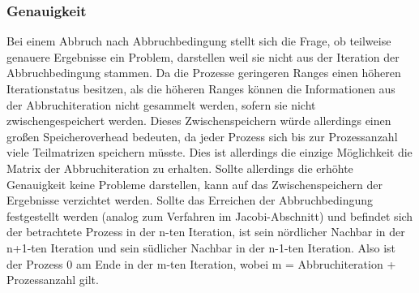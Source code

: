 \documentclass[a4paper,11pt,fleqn]{scrartcl}
\begin{document}
\subsubsection{Genauigkeit}
Bei einem Abbruch nach Abbruchbedingung stellt sich die Frage, ob teilweise genauere Ergebnisse ein Problem, darstellen weil sie nicht aus der Iteration der Abbruchbedingung stammen.
Da die Prozesse geringeren Ranges einen höheren Iterationstatus besitzen, als die höheren Ranges können die Informationen aus der Abbruchiteration nicht gesammelt werden, sofern sie nicht zwischengespeichert werden. 
Dieses Zwischenspeichern würde allerdings einen großen Speicheroverhead bedeuten, da jeder Prozess sich bis zur Prozessanzahl viele Teilmatrizen speichern müsste.
Dies ist allerdings die einzige Möglichkeit die Matrix der Abbruchiteration zu erhalten.
Sollte allerdings die erhöhte Genauigkeit keine Probleme darstellen, kann auf das Zwischenspeichern der Ergebnisse verzichtet werden.
Sollte das Erreichen der Abbruchbedingung festgestellt werden (analog zum Verfahren im Jacobi-Abschnitt) und befindet sich der betrachtete Prozess in der n-ten Iteration, ist sein nördlicher Nachbar in der n+1-ten Iteration und sein südlicher Nachbar in der n-1-ten Iteration.
Also ist der Prozess 0 am Ende in der m-ten Iteration, wobei m = Abbruchiteration + Prozessanzahl gilt.
\end{document}
